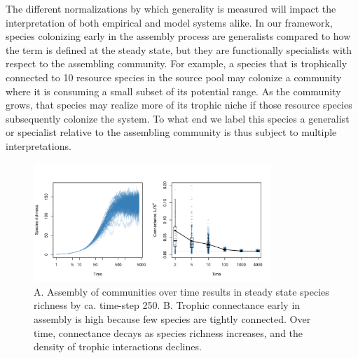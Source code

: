 \documentclass[twocolumn,preprintnumbers,amsmath,amssymb,superscriptaddress]{revtex4}
\begin{document}
The different normalizations by which generality is measured will impact the interpretation of both empirical and model systems alike.
In our framework, species colonizing early in the assembly process are generalists compared to how the term is defined at the steady state, but they are functionally specialists with respect to the assembling community.
For example, a species that is trophically connected to 10 resource species in the source pool may colonize a community where it is consuming a small subset of its potential range.
As the community grows, that species may realize more of its trophic niche if those resource species subsequently colonize the system.
To what end we label this species a generalist or specialist relative to the assembling community is thus subject to multiple interpretations.



\begin{figure}[h!]
\centering
\includegraphics[width=0.8\textwidth]{fig_conn.pdf}
\caption{
A. Assembly of communities over time results in steady state species richness by ca. time-step 250.
B. Trophic connectance early in assembly is high because few species are tightly connected.
Over time, connectance decays as species richness increases, and the density of trophic interactions declines.
}
\label{fig:conn}
\end{figure}
\end{document}
